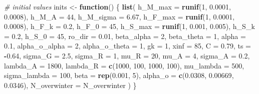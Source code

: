 \documentclass[
]{article}
\newenvironment{Shaded}{\begin{snugshade}}{\end{snugshade}}
\newcommand{\AttributeTok}[1]{\textcolor[rgb]{0.13,0.29,0.53}{#1}}
\newcommand{\CommentTok}[1]{\textcolor[rgb]{0.56,0.35,0.01}{\textit{#1}}}
\newcommand{\ControlFlowTok}[1]{\textcolor[rgb]{0.13,0.29,0.53}{\textbf{#1}}}
\newcommand{\DecValTok}[1]{\textcolor[rgb]{0.00,0.00,0.81}{#1}}
\newcommand{\FloatTok}[1]{\textcolor[rgb]{0.00,0.00,0.81}{#1}}
\newcommand{\FunctionTok}[1]{\textcolor[rgb]{0.13,0.29,0.53}{\textbf{#1}}}
\newcommand{\NormalTok}[1]{#1}
\newcommand{\OtherTok}[1]{\textcolor[rgb]{0.56,0.35,0.01}{#1}}
\newcommand{\SpecialCharTok}[1]{\textcolor[rgb]{0.81,0.36,0.00}{\textbf{#1}}}
\begin{document}
\begin{Shaded}
\begin{Highlighting}[]
\CommentTok{\# initial values}
\NormalTok{inits }\OtherTok{\textless{}{-}} \ControlFlowTok{function}\NormalTok{() \{}
  \FunctionTok{list}\NormalTok{(}
    \AttributeTok{h\_M\_max =} \FunctionTok{runif}\NormalTok{(}\DecValTok{1}\NormalTok{, }\FloatTok{0.0001}\NormalTok{, }\FloatTok{0.0008}\NormalTok{), }\AttributeTok{h\_M\_A =} \DecValTok{44}\NormalTok{, }\AttributeTok{h\_M\_sigma =} \FloatTok{6.67}\NormalTok{,}
    \AttributeTok{h\_F\_max =} \FunctionTok{runif}\NormalTok{(}\DecValTok{1}\NormalTok{, }\FloatTok{0.0001}\NormalTok{, }\FloatTok{0.0008}\NormalTok{), }\AttributeTok{h\_F\_k =} \FloatTok{0.2}\NormalTok{, }\AttributeTok{h\_F\_0 =} \DecValTok{45}\NormalTok{,}
    \AttributeTok{h\_S\_max =} \FunctionTok{runif}\NormalTok{(}\DecValTok{1}\NormalTok{, }\FloatTok{0.001}\NormalTok{, }\FloatTok{0.005}\NormalTok{), }\AttributeTok{h\_S\_k =} \FloatTok{0.2}\NormalTok{, }\AttributeTok{h\_S\_0 =} \DecValTok{45}\NormalTok{,}
    \AttributeTok{ro\_dir =} \FloatTok{0.01}\NormalTok{, }\AttributeTok{beta\_alpha =} \DecValTok{2}\NormalTok{, }\AttributeTok{beta\_theta =} \DecValTok{1}\NormalTok{, }\AttributeTok{alpha =} \FloatTok{0.1}\NormalTok{,}
    \AttributeTok{alpha\_o\_alpha =} \DecValTok{2}\NormalTok{, }\AttributeTok{alpha\_o\_theta =} \DecValTok{1}\NormalTok{, }\AttributeTok{gk =} \DecValTok{1}\NormalTok{, }\AttributeTok{xinf =} \DecValTok{85}\NormalTok{,}
    \AttributeTok{C =} \FloatTok{0.79}\NormalTok{, }\AttributeTok{ts =} \SpecialCharTok{{-}}\FloatTok{0.64}\NormalTok{, }\AttributeTok{sigma\_G =} \FloatTok{2.5}\NormalTok{, }\AttributeTok{sigma\_R =} \DecValTok{1}\NormalTok{,}
    \AttributeTok{mu\_R =} \DecValTok{20}\NormalTok{, }\AttributeTok{mu\_A =} \DecValTok{4}\NormalTok{, }\AttributeTok{sigma\_A =} \FloatTok{0.2}\NormalTok{,}
    \AttributeTok{lambda\_A =} \DecValTok{1800}\NormalTok{, }\AttributeTok{lambda\_R =} \FunctionTok{c}\NormalTok{(}\DecValTok{1000}\NormalTok{, }\DecValTok{100}\NormalTok{, }\DecValTok{1000}\NormalTok{, }\DecValTok{100}\NormalTok{), }\AttributeTok{mu\_lambda =} \DecValTok{500}\NormalTok{,}
    \AttributeTok{sigma\_lambda =} \DecValTok{100}\NormalTok{, }\AttributeTok{beta =} \FunctionTok{rep}\NormalTok{(}\FloatTok{0.001}\NormalTok{, }\DecValTok{5}\NormalTok{),}
    \AttributeTok{alpha\_o =} \FunctionTok{c}\NormalTok{(}\FloatTok{0.0308}\NormalTok{, }\FloatTok{0.00669}\NormalTok{, }\FloatTok{0.0346}\NormalTok{), }\AttributeTok{N\_overwinter =}\NormalTok{ N\_overwinter}
\NormalTok{  )}
\NormalTok{\}}
\end{Highlighting}
\end{Shaded}
\end{document}
